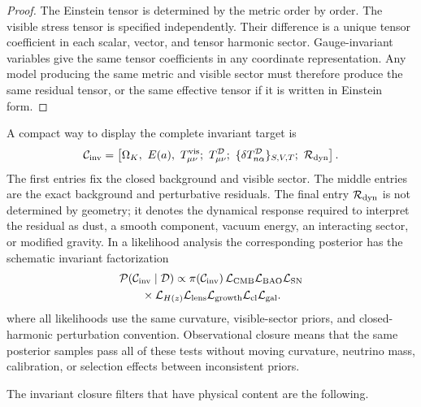\documentclass[
  aps,
  prd,
  reprint,
  superscriptaddress,
  nofootinbib,
  floatfix,
  longbibliography
]{revtex4-2}
\theoremstyle{plain}
\theoremstyle{definition}
\theoremstyle{remark}
\newcommand{\D}{\mathcal D}
\begin{document}
\begin{proof}
The Einstein tensor is determined by the metric order by order.  The visible
stress tensor is specified independently.  Their difference is a unique tensor
coefficient in each scalar, vector, and tensor harmonic sector.  Gauge-invariant
variables give the same tensor coefficients in any coordinate representation.
Any model producing the same metric and visible sector must therefore produce
the same residual tensor, or the same effective tensor if it is written in
Einstein form.
\end{proof}

A compact way to display the complete invariant target is
\begin{equation}
\mathcal C_{\rm inv}=
\left[
\Omega_K,\ E(a),\ T^{\rm vis}_{\mu\nu};
\ T^\D_{\mu\nu};
\ \{\delta T^\D_{n\alpha}\}_{S,V,T};
\ \mathcal R_{\rm dyn}
\right].
\label{eq:complete_invariant_target}
\end{equation}
The first entries fix the closed background and visible sector.  The middle
entries are the exact background and perturbative residuals.  The final entry
$\mathcal R_{\rm dyn}$ is not determined by geometry; it denotes the dynamical
response required to interpret the residual as dust, a smooth component,
vacuum energy, an interacting sector, or modified gravity.  In a likelihood
analysis the corresponding posterior has the schematic invariant factorization
\begin{multline}
\mathcal P(\mathcal C_{\rm inv}\mid\mathcal D)
\propto
\pi(\mathcal C_{\rm inv})\,
\mathcal L_{\rm CMB}\mathcal L_{\rm BAO}\mathcal L_{\rm SN}\\
{}\times
\mathcal L_{H(z)}\mathcal L_{\rm lens}
\mathcal L_{\rm growth}\mathcal L_{\rm cl}\mathcal L_{\rm gal}.
\label{eq:closure_posterior}
\end{multline}
where all likelihoods use the same curvature, visible-sector priors, and
closed-harmonic perturbation convention.  Observational closure means that the
same posterior samples pass all of these tests without moving curvature,
neutrino mass, calibration, or selection effects between inconsistent priors.

The invariant closure filters that have physical content are the following.
\end{document}
